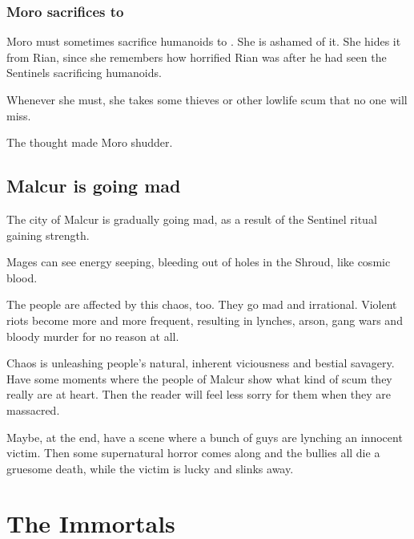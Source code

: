 \begin{garbage}
\subsubsection{Moro sacrifices to {\Nasshikerr}}
Moro must sometimes sacrifice humanoids to \Nasshikerr. 
She is ashamed of it. 
She hides it from Rian, since she remembers how horrified Rian was after he had seen the Sentinels sacrificing humanoids. 

Whenever she must, she takes some thieves or other lowlife scum that no one will miss. 

\begin{prose}
  The thought made Moro shudder.  
\end{prose}









\subsection{Malcur is going mad}
The city of Malcur is gradually going mad, as a result of the Sentinel ritual gaining strength. 

Mages can see energy seeping, bleeding out of holes in the Shroud, like cosmic blood. 

The people are affected by this chaos, too. They go mad and irrational. Violent riots become more and more frequent, resulting in lynches, arson, gang wars and bloody murder for no reason at all. 

Chaos is unleashing people's natural, inherent viciousness and bestial savagery. Have some  moments where the people of Malcur show what kind of scum they really are at heart. Then the reader will feel less sorry for them when they are massacred. 

Maybe, at the end, have a scene where a bunch of guys are lynching an innocent victim. Then some supernatural horror comes along and the bullies all die a gruesome death, while the victim is lucky and slinks away. 
















\section{The Immortals}








\end{garbage}
